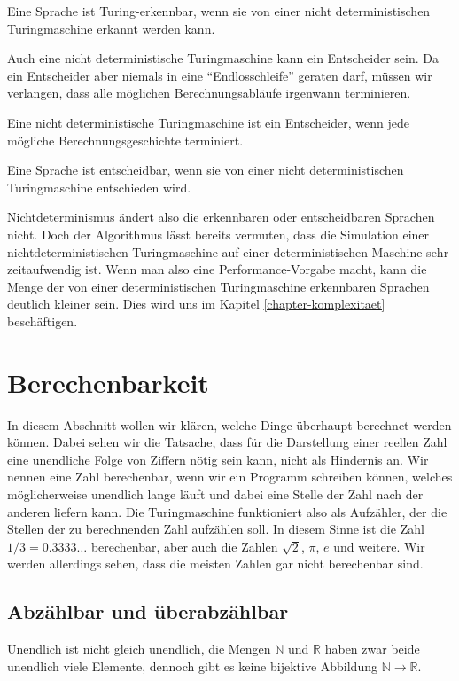 \begin{satz}
Eine Sprache ist Turing-erkennbar, wenn sie von einer nicht deterministischen
Turingmaschine erkannt werden kann.
\end{satz}

Auch eine nicht deterministische Turingmaschine kann ein Entscheider sein.
Da ein Entscheider aber niemals in eine ``Endlosschleife'' geraten darf,
müssen wir verlangen, dass alle möglichen Berechnungsabläufe
irgenwann terminieren.

\begin{definition}
Eine nicht deterministische Turingmaschine ist ein Entscheider, wenn
jede mögliche Berechnungsgeschichte terminiert.
\end{definition}

\begin{satz}
Eine Sprache ist entscheidbar, wenn sie von einer nicht deterministischen
Turingmaschine entschieden wird.
\end{satz}

Nichtdeterminismus ändert also die erkennbaren oder entscheidbaren Sprachen
nicht. Doch der Algorithmus lässt bereits vermuten, dass die Simulation
einer nichtdeterministischen Turingmaschine auf einer deterministischen
Maschine sehr zeitaufwendig ist. Wenn man also eine Performance-Vorgabe
macht, kann die Menge der von einer deterministischen Turingmaschine
erkennbaren Sprachen deutlich kleiner sein. Dies wird uns im Kapitel
\ref{chapter-komplexitaet} beschäftigen.

\section{Berechenbarkeit}
In diesem Abschnitt wollen wir klären, welche Dinge überhaupt
berechnet werden können. Dabei sehen wir die Tatsache, dass für
die Darstellung einer reellen Zahl eine unendliche Folge von Ziffern
nötig sein kann, nicht als Hindernis an. Wir nennen eine Zahl
berechenbar, wenn wir ein Programm schreiben können, welches
möglicherweise unendlich lange läuft und dabei eine Stelle der
Zahl nach der anderen liefern kann. Die Turingmaschine
funktioniert also als Aufzähler, der die Stellen der zu berechnenden
Zahl aufzählen soll.  In diesem Sinne ist die
Zahl $1/3=0.3333\dots$ berechenbar, aber auch die Zahlen $\sqrt{2}$, $\pi$,
$e$ und weitere. Wir werden allerdings sehen, dass die meisten
Zahlen gar nicht berechenbar sind.

\subsection{Abzählbar und überabzählbar}
Unendlich ist nicht gleich unendlich, die Mengen $\mathbb N$ und
$\mathbb R$ haben zwar beide unendlich viele Elemente, dennoch
gibt es keine bijektive Abbildung $\mathbb N\to \mathbb R$.

